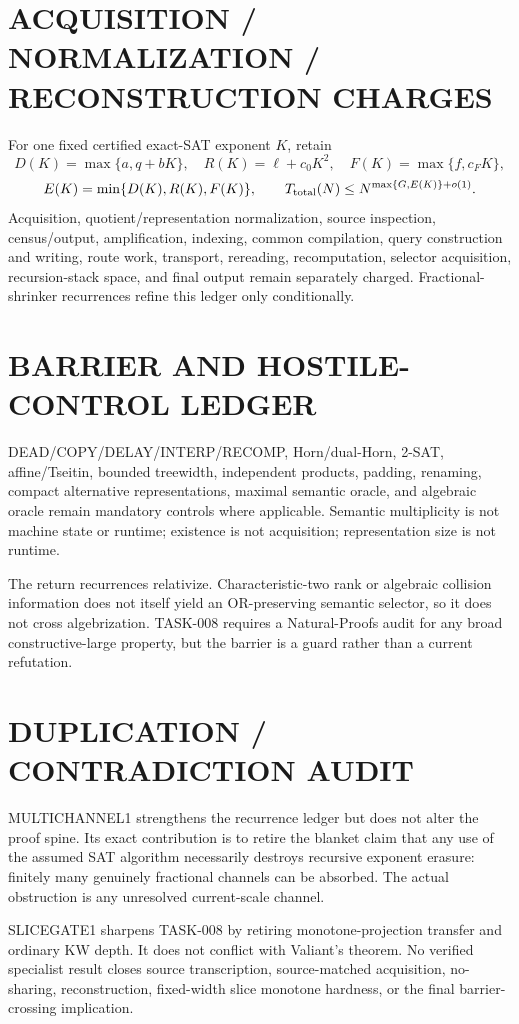 \documentclass[11pt]{article}
\begin{document}
\section*{ACQUISITION / NORMALIZATION / RECONSTRUCTION CHARGES}
For one fixed certified exact-SAT exponent $K$, retain
\[
D(K)=\max\{a,q+bK\},\quad
R(K)=\ell+c_0K^2,\quad
F(K)=\max\{f,c_FK\},
\]
\[
E(K)=\min\{D(K),R(K),F(K)\},\qquad
T_{\rm total}(N)\le N^{\max\{G,E(K)\}+o(1)}.
\]
Acquisition, quotient/representation normalization, source inspection, census/output, amplification, indexing, common compilation, query construction and writing, route work, transport, rereading, recomputation, selector acquisition, recursion-stack space, and final output remain separately charged. Fractional-shrinker recurrences refine this ledger only conditionally.

\section*{BARRIER AND HOSTILE-CONTROL LEDGER}
DEAD/COPY/DELAY/INTERP/RECOMP, Horn/dual-Horn, 2-SAT, affine/Tseitin, bounded treewidth, independent products, padding, renaming, compact alternative representations, maximal semantic oracle, and algebraic oracle remain mandatory controls where applicable. Semantic multiplicity is not machine state or runtime; existence is not acquisition; representation size is not runtime.

The return recurrences relativize. Characteristic-two rank or algebraic collision information does not itself yield an OR-preserving semantic selector, so it does not cross algebrization. TASK-008 requires a Natural-Proofs audit for any broad constructive-large property, but the barrier is a guard rather than a current refutation.

\section*{DUPLICATION / CONTRADICTION AUDIT}
MULTICHANNEL1 strengthens the recurrence ledger but does not alter the proof spine. Its exact contribution is to retire the blanket claim that any use of the assumed SAT algorithm necessarily destroys recursive exponent erasure: finitely many genuinely fractional channels can be absorbed. The actual obstruction is any unresolved current-scale channel.

SLICEGATE1 sharpens TASK-008 by retiring monotone-projection transfer and ordinary KW depth. It does not conflict with Valiant's theorem. No verified specialist result closes source transcription, source-matched acquisition, no-sharing, reconstruction, fixed-width slice monotone hardness, or the final barrier-crossing implication.
\end{document}
